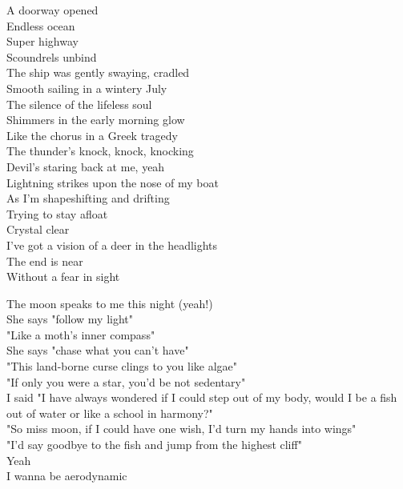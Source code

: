 


A doorway opened\\
Endless ocean\\
Super highway\\
Scoundrels unbind\\
The ship was gently swaying, cradled\\
Smooth sailing in a wintery July\\
The silence of the lifeless soul\\
Shimmers in the early morning glow\\
Like the chorus in a Greek tragedy\\
The thunder's knock, knock, knocking\\
Devil's staring back at me, yeah\\

Lightning strikes upon the nose of my boat\\
As I'm shapeshifting and drifting\\
Trying to stay afloat\\
Crystal clear\\
I've got a vision of a deer in the headlights\\
The end is near\\
Without a fear in sight\\


The moon speaks to me this night (yeah!)\\
She says "follow my light"\\
"Like a moth's inner compass"\\
She says "chase what you can't have"\\
"This land-borne curse clings to you like algae"\\
"If only you were a star, you'd be not sedentary"\\
I said "I have always wondered if I could step out of my body, would I be a fish out of water or like a school in harmony?"\\
"So miss moon, if I could have one wish, I'd turn my hands into wings"\\
"I'd say goodbye to the fish and jump from the highest cliff"\\

Yeah\\
I wanna be aerodynamic\\

